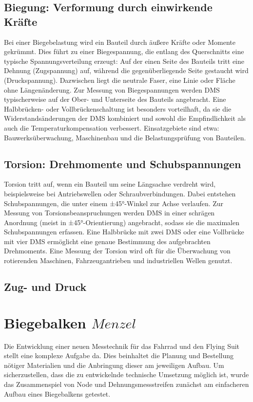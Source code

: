 \subsection{Biegung: Verformung durch einwirkende Kräfte}
Bei einer Biegebelastung wird ein Bauteil durch äußere Kräfte oder Momente gekrümmt. Dies führt zu einer Biegespannung, die entlang des Querschnitts eine typische Spannungsverteilung erzeugt: Auf der einen Seite des Bauteils tritt eine Dehnung (Zugspannung) auf, während die gegenüberliegende Seite gestaucht wird (Druckspannung). Dazwischen liegt die neutrale Faser, eine Linie oder Fläche ohne Längenänderung.
Zur Messung von Biegespannungen werden DMS typischerweise auf der Ober- und Unterseite des Bauteils angebracht. Eine Halbbrücken- oder Vollbrückenschaltung ist besonders vorteilhaft, da sie die Widerstandsänderungen der DMS kombiniert und sowohl die Empfindlichkeit als auch die Temperaturkompensation verbessert. Einsatzgebiete sind etwa: Bauwerksüberwachung, Maschinenbau und die Belastungsprüfung von Bauteilen.

\subsection{Torsion: Drehmomente und Schubspannungen}
Torsion tritt auf, wenn ein Bauteil um seine Längsachse verdreht wird, beispielsweise bei Antriebswellen oder Schraubverbindungen. Dabei entstehen Schubspannungen, die unter einem ±45°-Winkel zur Achse verlaufen.
Zur Messung von Torsionsbeanspruchungen werden DMS in einer schrägen Anordnung (meist in ±45°-Orientierung) angebracht, sodass sie die maximalen Schubspannungen erfassen. Eine Halbbrücke mit zwei DMS oder eine Vollbrücke mit vier DMS ermöglicht eine genaue Bestimmung des aufgebrachten Drehmoments. Eine Messung der Torsion wird oft für die Überwachung von rotierenden Maschinen, Fahrzeugantrieben und industriellen Wellen genutzt.

\subsection{Zug- und Druck}
\todo{}





\section{Biegebalken \(Menzel\)}
Die Entwicklung einer neuen Messtechnik für das Fahrrad und den Flying Suit stellt eine komplexe Aufgabe da.
Dies beinhaltet die Planung und Bestellung nötiger Materialien und die Anbringung dieser am jeweiligen Aufbau.
Um sicherzustellen, dass die zu entwickelnde technische Umsetzung möglich ist, wurde das Zusammenspiel von Node und Dehnungsmessstreifen zunächst am einfacheren Aufbau eines Biegebalkens getestet.


